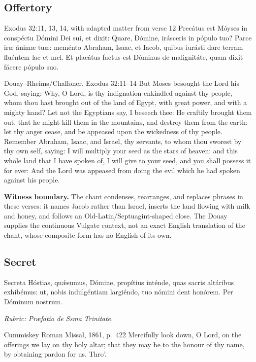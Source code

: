\subsection*{Offertory }
\begin{appointedlatin}{Exodus 32:11, 13, 14, with adapted matter from verse 12}
Precátus est Móyses in conspéctu Dómini Dei sui, et dixit: Quare, Dómine,
irásceris in pópulo tuo? Parce iræ ánimæ tuæ: meménto Abraham, Isaac, et
Iacob, quibus iurásti dare terram fluéntem lac et mel. Et placátus factus est
Dóminus de malignitáte, quam dixit fácere pópulo suo.
\end{appointedlatin}
\begin{namedtranslation}{Douay--Rheims/Challoner, Exodus 32:11--14}
But Moses besought the Lord his God, saying: Why, O Lord, is thy indignation
enkindled against thy people, whom thou hast brought out of the land of Egypt,
with great power, and with a mighty hand? Let not the Egyptians say, I beseech
thee: He craftily brought them out, that he might kill them in the mountains,
and destroy them from the earth: let thy anger cease, and be appeased upon the
wickedness of thy people. Remember Abraham, Isaac, and Israel, thy servants,
to whom thou sworest by thy own self, saying: I will multiply your seed as the
stars of heaven: and this whole land that I have spoken of, I will give to your
seed, and you shall possess it for ever: And the Lord was appeased from doing
the evil which he had spoken against his people.

\textbf{Witness boundary.} The chant condenses, rearranges, and replaces
phrases in these verses: it names Jacob rather than Israel, inserts the land
flowing with milk and honey, and follows an Old-Latin/Septuagint-shaped close.
The Douay supplies the continuous Vulgate context, not an exact English
translation of the chant, whose composite form has no English of its own.
\end{namedtranslation}

\elementguard
\subsection*{Secret }
\begin{appointedlatin}{Secreta}
Hóstias, quǽsumus, Dómine, propítius inténde, quas sacris altáribus
exhibémus: ut, nobis indulgéntiam largiéndo, tuo nómini dent honórem. Per
Dóminum nostrum.

\emph{Rubric: Præfatio de Ssma Trinitate.}
\end{appointedlatin}
\begin{namedtranslation}{Cummiskey Roman Missal, 1861, p.~422}
Mercifully look down, O Lord, on the offerings we lay on thy holy altar; that
they may be to the honour of thy name, by obtaining pardon for us. Thro'.
\end{namedtranslation}

